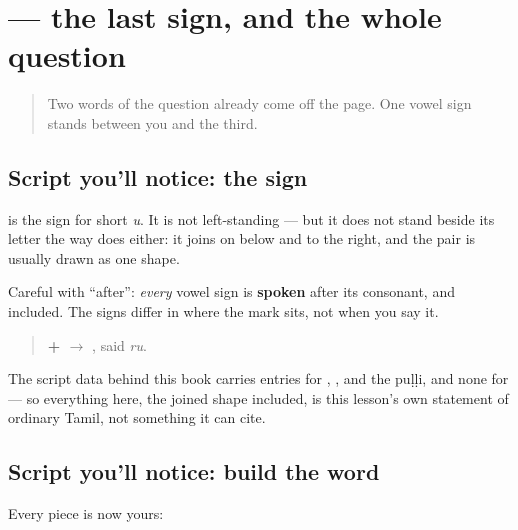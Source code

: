 \section[\texorpdfstring{\ta{இருக்கிறீர்கள்} (irukkiṟīrgaḷ)}{இருக்கிறீர்கள் (irukkiṟīrgaḷ)}]{ — the last sign, and the whole question}

\label{lesson:TA-W13-read-irukkirirgal}



\begin{quote}
Two words of the question already come off the page. One vowel sign stands between you and the third.
\end{quote}

\subsection*{Script you'll notice: the  sign}
\textbf{} is the sign for short \emph{u}. It is not left-standing — but it does not stand beside its letter the way \textbf{} does either: it joins on below and to the right, and the pair is usually drawn as one shape.

Careful with \textquotedblleft{}after\textquotedblright{}: \emph{every} vowel sign is \textbf{spoken} after its consonant, \textbf{} and \textbf{} included. The signs differ in where the mark sits, not when you say it.

\begin{quote}
\textbf{ +  $\to$ }, said \emph{ru}.
\end{quote}

The script data behind this book carries entries for \textbf{}, \textbf{}, \textbf{} and the puḷḷi, and none for \textbf{} — so everything here, the joined shape included, is this lesson's own statement of ordinary Tamil, not something it can cite.

\subsection*{Script you'll notice: build the word}
Every piece is now yours:

